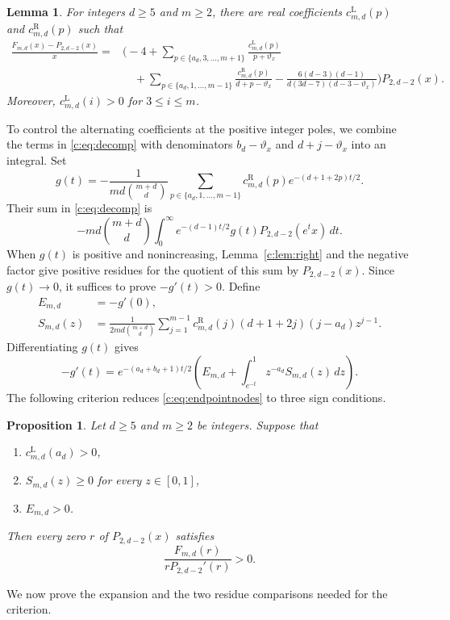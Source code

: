 \documentclass[10pt,a4paper]{article}
\numberwithin{equation}{section}
\newtheorem{lemma}[theorem]{Lemma}
\newtheorem{proposition}[theorem]{Proposition}
\theoremstyle{remark}\newtheorem{remark}[theorem]{Remark}
\newcommand{\varthetax}{\vartheta_x}
\begin{document}
\enlargethispage{\baselineskip}
\begin{lemma}\label{c:lem:decomposition}
For integers $d\ge5$ and $m\ge2$, there are real coefficients
$c_{m,d}^{\mathrm L}(p)$ and $c_{m,d}^{\mathrm R}(p)$ such that
\begin{equation}\label{c:eq:decomp}
 \begin{aligned}
 \frac{F_{m,d}(x)-P_{2,d-2}(x)}{x}
 ={}&\biggl(-4+
 \sum_{p\in\{a_d,3,\ldots,m+1\}}
 \frac{c_{m,d}^{\mathrm L}(p)}{p+\varthetax}\\
 &\quad+\sum_{p\in\{a_d,1,\ldots,m-1\}}
 \frac{c_{m,d}^{\mathrm R}(p)}{d+p-\varthetax}
 -\frac{6(d-3)(d-1)}{d(3d-7)(d-3-\varthetax)}\biggr)P_{2,d-2}(x).
 \end{aligned}
\end{equation}
Moreover, $c_{m,d}^{\mathrm L}(i)>0$ for $3\le i\le m$.
\end{lemma}
\pagebreak[3]
To control the alternating coefficients at the positive integer poles,
we combine the terms in \eqref{c:eq:decomp} with denominators
$b_d-\varthetax$ and $d+j-\varthetax$ into an integral. Set
\[
 g(t)=-\frac1{md\binom{m+d}{d}}
 \sum_{p\in\{a_d,1,\ldots,m-1\}}
 c_{m,d}^{\mathrm R}(p)e^{-(d+1+2p)t/2}.
\]
Their sum in \eqref{c:eq:decomp} is
\[
 -md\binom{m+d}{d}\int_0^\infty
 e^{-(d-1)t/2}g(t)P_{2,d-2}(e^tx)\,dt.
\]
When $g(t)$ is positive and nonincreasing, Lemma~\ref{c:lem:right} and the
negative factor give positive residues for the quotient of this sum
by $P_{2,d-2}(x)$.
Since $g(t)\to0$, it suffices to prove $-g'(t)>0$. Define
\begin{align*}
 E_{m,d}&=-g'(0),\\
 S_{m,d}(z)&=\frac1{2md\binom{m+d}{d}}\sum_{j=1}^{m-1}
 c_{m,d}^{\mathrm R}(j)(d+1+2j)(j-a_d)z^{j-1}.
\end{align*}
Differentiating $g(t)$ gives
\begin{equation}\label{c:eq:weightderivative}
 -g'(t)=e^{-(a_d+b_d+1)t/2}
 \left(E_{m,d}+\int_{e^{-t}}^1z^{-a_d}S_{m,d}(z)\,dz\right).
\end{equation}
The following criterion reduces \eqref{c:eq:endpointnodes} to three
sign conditions.

\begin{proposition}\label{c:th:criterion}
Let $d\ge5$ and $m\ge2$ be integers. Suppose that
\begin{enumerate}
\renewcommand{\theenumi}{\roman{enumi}}
\renewcommand{\labelenumi}{(\theenumi)}
\item\label{c:cond:left} $c_{m,d}^{\mathrm L}(a_d)>0$,
\item\label{c:cond:kernel} $S_{m,d}(z)\ge0$ for every $z\in[0,1]$,
\item\label{c:cond:gap} $E_{m,d}>0$.
\end{enumerate}
Then every zero $r$ of $P_{2,d-2}(x)$ satisfies
\[
 \frac{F_{m,d}(r)}{rP_{2,d-2}'(r)}>0.
\]
\end{proposition}
We now prove the expansion and the two residue comparisons needed for
the criterion.
\end{document}
